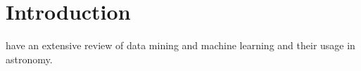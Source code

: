 \section{Introduction}

\cite{Ball10} have an extensive review of data mining and machine learning and their usage in astronomy.


